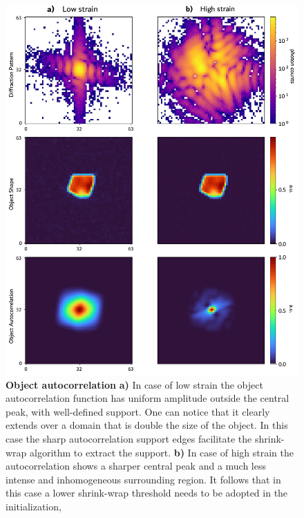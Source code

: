 \begin{figure}[H]
    \centering
    \includegraphics[width=\textwidth]{figures/Intro/autocorr.pdf}
    \caption{\textbf{Object autocorrelation} \textbf{a)} In case of low strain the object autocorrelation function has 
    uniform amplitude outside the central peak, with well-defined support. One can notice that it clearly extends over a domain 
    that is double the size of the object. 
    In this case the sharp autocorrelation support edges facilitate the shrink-wrap algorithm to extract the support. \textbf{b)} In case of high 
    strain the autocorrelation shows a sharper central peak and a much less intense and inhomogeneous surrounding region. 
    It follows that in this case a lower shrink-wrap threshold needs to be adopted in the initialization, }
    \label{fig:autocorr}
\end{figure}


